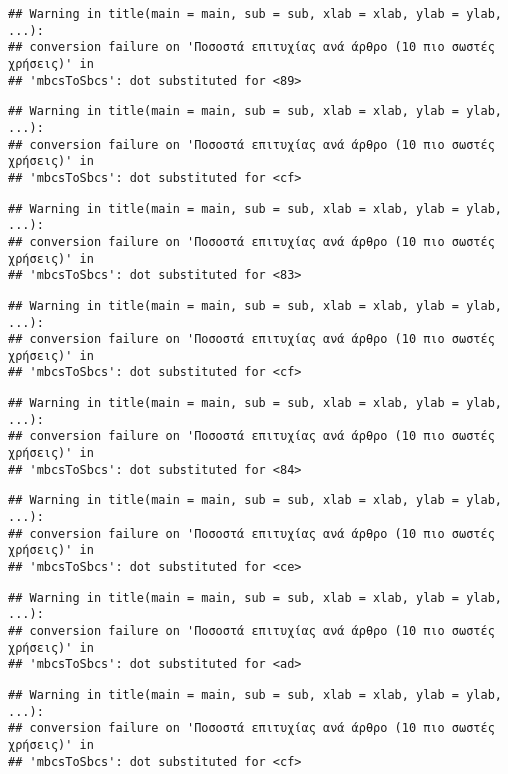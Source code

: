 \documentclass[
]{article}
\begin{document}
\begin{verbatim}
## Warning in title(main = main, sub = sub, xlab = xlab, ylab = ylab, ...):
## conversion failure on 'Ποσοστά επιτυχίας ανά άρθρο (10 πιο σωστές χρήσεις)' in
## 'mbcsToSbcs': dot substituted for <89>
\end{verbatim}

\begin{verbatim}
## Warning in title(main = main, sub = sub, xlab = xlab, ylab = ylab, ...):
## conversion failure on 'Ποσοστά επιτυχίας ανά άρθρο (10 πιο σωστές χρήσεις)' in
## 'mbcsToSbcs': dot substituted for <cf>
\end{verbatim}

\begin{verbatim}
## Warning in title(main = main, sub = sub, xlab = xlab, ylab = ylab, ...):
## conversion failure on 'Ποσοστά επιτυχίας ανά άρθρο (10 πιο σωστές χρήσεις)' in
## 'mbcsToSbcs': dot substituted for <83>
\end{verbatim}

\begin{verbatim}
## Warning in title(main = main, sub = sub, xlab = xlab, ylab = ylab, ...):
## conversion failure on 'Ποσοστά επιτυχίας ανά άρθρο (10 πιο σωστές χρήσεις)' in
## 'mbcsToSbcs': dot substituted for <cf>
\end{verbatim}

\begin{verbatim}
## Warning in title(main = main, sub = sub, xlab = xlab, ylab = ylab, ...):
## conversion failure on 'Ποσοστά επιτυχίας ανά άρθρο (10 πιο σωστές χρήσεις)' in
## 'mbcsToSbcs': dot substituted for <84>
\end{verbatim}

\begin{verbatim}
## Warning in title(main = main, sub = sub, xlab = xlab, ylab = ylab, ...):
## conversion failure on 'Ποσοστά επιτυχίας ανά άρθρο (10 πιο σωστές χρήσεις)' in
## 'mbcsToSbcs': dot substituted for <ce>
\end{verbatim}

\begin{verbatim}
## Warning in title(main = main, sub = sub, xlab = xlab, ylab = ylab, ...):
## conversion failure on 'Ποσοστά επιτυχίας ανά άρθρο (10 πιο σωστές χρήσεις)' in
## 'mbcsToSbcs': dot substituted for <ad>
\end{verbatim}

\begin{verbatim}
## Warning in title(main = main, sub = sub, xlab = xlab, ylab = ylab, ...):
## conversion failure on 'Ποσοστά επιτυχίας ανά άρθρο (10 πιο σωστές χρήσεις)' in
## 'mbcsToSbcs': dot substituted for <cf>
\end{verbatim}
\end{document}
